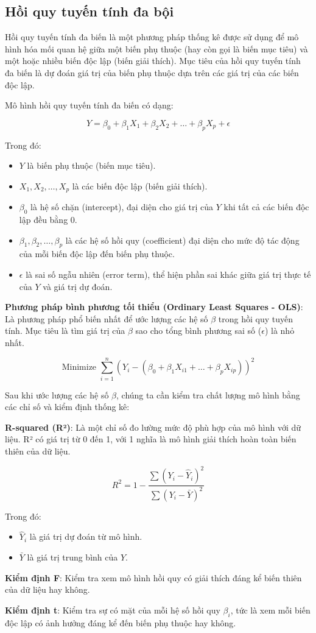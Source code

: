 \subsection{Hồi quy tuyến tính đa bội}
Hồi quy tuyến tính đa biến là một phương pháp thống kê được sử dụng để mô hình hóa mối quan hệ giữa một biến phụ thuộc (hay còn gọi là biến mục tiêu) và một hoặc nhiều biến độc lập (biến giải thích). Mục tiêu của hồi quy tuyến tính đa biến là dự đoán giá trị của biến phụ thuộc dựa trên các giá trị của các biến độc lập.

Mô hình hồi quy tuyến tính đa biến có dạng:

\[
Y = \beta_0 + \beta_1 X_1 + \beta_2 X_2 + \dots + \beta_p X_p + \epsilon
\]

Trong đó:
\begin{itemize}
  \item \(Y\) là biến phụ thuộc (biến mục tiêu).
  \item \(X_1, X_2, \dots, X_p\) là các biến độc lập (biến giải thích).
  \item \(\beta_0\) là hệ số chặn (intercept), đại diện cho giá trị của \(Y\) khi tất cả các biến độc lập đều bằng 0.
  \item \(\beta_1, \beta_2, \dots, \beta_p\) là các hệ số hồi quy (coefficient) đại diện cho mức độ tác động của mỗi biến độc lập đến biến phụ thuộc.
  \item \(\epsilon\) là sai số ngẫu nhiên (error term), thể hiện phần sai khác giữa giá trị thực tế của \(Y\) và giá trị dự đoán.
\end{itemize}

\textbf{Phương pháp bình phương tối thiểu (Ordinary Least Squares - OLS)}: Là phương pháp phổ biến nhất để ước lượng các hệ số \(\beta\) trong hồi quy tuyến tính. Mục tiêu là tìm giá trị của \(\beta\) sao cho tổng bình phương sai số (\(\epsilon\)) là nhỏ nhất.
  
\[
\text{Minimize } \sum_{i=1}^{n} (Y_i - (\beta_0 + \beta_1 X_{i1} + \dots + \beta_p X_{ip}))^2
\]

Sau khi ước lượng các hệ số \(\beta\), chúng ta cần kiểm tra chất lượng mô hình bằng các chỉ số và kiểm định thống kê:

\textbf{R-squared (R²)}: Là một chỉ số đo lường mức độ phù hợp của mô hình với dữ liệu. R² có giá trị từ 0 đến 1, với 1 nghĩa là mô hình giải thích hoàn toàn biến thiên của dữ liệu.
  
  \[
  R^2 = 1 - \frac{\sum (Y_i - \hat{Y}_i)^2}{\sum (Y_i - \bar{Y})^2}
  \]
  
  Trong đó:
  \begin{itemize}
    \item \(\hat{Y}_i\) là giá trị dự đoán từ mô hình.
    \item \(\bar{Y}\) là giá trị trung bình của \(Y\).
  \end{itemize}

\textbf{Kiểm định F}: Kiểm tra xem mô hình hồi quy có giải thích đáng kể biến thiên của dữ liệu hay không.

\textbf{Kiểm định t}: Kiểm tra sự có mặt của mỗi hệ số hồi quy \(\beta_i\), tức là xem mỗi biến độc lập có ảnh hưởng đáng kể đến biến phụ thuộc hay không.
